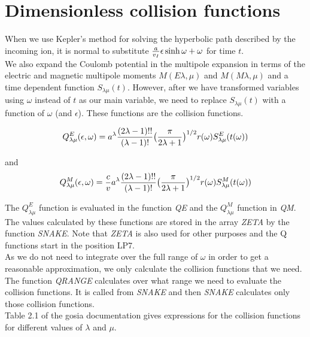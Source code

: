 \chapter{Dimensionless collision functions}
\label{chapt:collision}

When we use Kepler's method for solving the hyperbolic path described by the
incoming ion, it is normal to substitute ${a \over v_I} \epsilon\sinh\omega
+ \omega$ for time $t$.\\

We also expand the Coulomb potential in the multipole expansion in terms of
the electric and magnetic multipole moments $M(E\lambda,\mu)$ and
$M(M\lambda,\mu)$ and a time dependent function $S_{\lambda\mu}(t)$.
However, after we have transformed variables using $\omega$ instead of $t$
as our main variable, we need to replace $S_{\lambda\mu}(t)$ with a function
of $\omega$ (and $\epsilon$). These functions are the collision functions.

\begin{equation}
Q^E_{\lambda\mu}(\epsilon, \omega) =
a^\lambda
{(2\lambda-1)!! \over (\lambda-1)!}
\big({\pi \over 2\lambda+1}\big)^{1/2}
r(\omega)
S^E_{\lambda\mu}(t(\omega))
\end{equation}

and\\

\begin{equation}
Q^M_{\lambda\mu}(\epsilon, \omega) =
{c \over v}
a^\lambda
{(2\lambda-1)!! \over (\lambda-1)!}
\big({\pi \over 2\lambda+1}\big)^{1/2}
r(\omega)
S^M_{\lambda\mu}(t(\omega))
\end{equation}

The $Q^E_{\lambda\mu}$ function is evaluated in the function {\em QE} and
the $Q^M_{\lambda\mu}$ function in {\em QM}. The values calculated by these
functions are stored in the array {\em ZETA} by the function {\em SNAKE}.
Note that {\em ZETA} is also used for other purposes and the Q functions
start in the position LP7.\\

As we do not need to integrate over the full range of $\omega$ in order to
get a reasonable approximation, we only calculate the collision functions
that we need. The function {\em QRANGE} calculates over what range we need
to evaluate the collision functions. It is called from {\em SNAKE} and then
{\em SNAKE} calculates only those collision functions.\\

Table 2.1 of the gosia documentation gives expressions for the collision
functions for different values of $\lambda$ and $\mu$.


